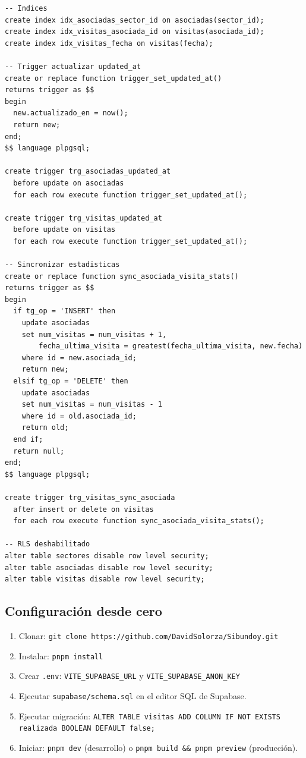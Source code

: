 \documentclass[12pt]{article}
\begin{document}
\begin{lstlisting}[style=sqlstyle]
-- Indices
create index idx_asociadas_sector_id on asociadas(sector_id);
create index idx_visitas_asociada_id on visitas(asociada_id);
create index idx_visitas_fecha on visitas(fecha);

-- Trigger actualizar updated_at
create or replace function trigger_set_updated_at()
returns trigger as $$
begin
  new.actualizado_en = now();
  return new;
end;
$$ language plpgsql;

create trigger trg_asociadas_updated_at
  before update on asociadas
  for each row execute function trigger_set_updated_at();

create trigger trg_visitas_updated_at
  before update on visitas
  for each row execute function trigger_set_updated_at();

-- Sincronizar estadisticas
create or replace function sync_asociada_visita_stats()
returns trigger as $$
begin
  if tg_op = 'INSERT' then
    update asociadas
    set num_visitas = num_visitas + 1,
        fecha_ultima_visita = greatest(fecha_ultima_visita, new.fecha)
    where id = new.asociada_id;
    return new;
  elsif tg_op = 'DELETE' then
    update asociadas
    set num_visitas = num_visitas - 1
    where id = old.asociada_id;
    return old;
  end if;
  return null;
end;
$$ language plpgsql;

create trigger trg_visitas_sync_asociada
  after insert or delete on visitas
  for each row execute function sync_asociada_visita_stats();

-- RLS deshabilitado
alter table sectores disable row level security;
alter table asociadas disable row level security;
alter table visitas disable row level security;
\end{lstlisting}

\subsection{Configuraci\'on desde cero}
\begin{enumerate}[nosep]
  \item Clonar: \texttt{git clone https://github.com/DavidSolorza/Sibundoy.git}
  \item Instalar: \texttt{pnpm install}
  \item Crear \texttt{.env}: \texttt{VITE\_SUPABASE\_URL} y \texttt{VITE\_SUPABASE\_ANON\_KEY}
  \item Ejecutar \texttt{supabase/schema.sql} en el editor SQL de Supabase.
  \item Ejecutar migraci\'on: \texttt{ALTER TABLE visitas ADD COLUMN IF NOT EXISTS realizada BOOLEAN DEFAULT false;}
  \item Iniciar: \texttt{pnpm dev} (desarrollo) o \texttt{pnpm build \&\& pnpm preview} (producci\'on).
\end{enumerate}
\end{document}
